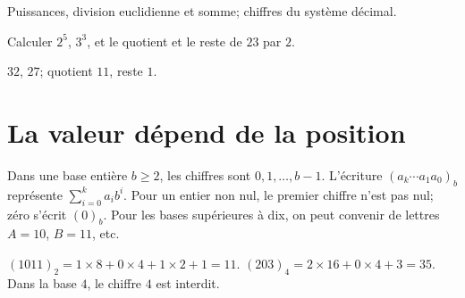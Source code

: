 \label{t11s-c11}
\begin{revision}Puissances, division euclidienne et somme; chiffres du système décimal.\end{revision}
\begin{automatismes}\exo\label{t11s-c11-auto}Calculer $2^5$, $3^3$, et le quotient et le reste de $23$ par $2$.\end{automatismes}
\begin{corrige}\label{sol-t11s-c11-auto}$32$, $27$; quotient $11$, reste $1$.\end{corrige}

\section{La valeur dépend de la position}
\begin{definition}Dans une base entière $b\ge2$, les chiffres sont $0,1,\ldots,b-1$. L’écriture $(a_k\cdots a_1a_0)_b$ représente $\sum_{i=0}^k a_i b^i$. Pour un entier non nul, le premier chiffre n’est pas nul; zéro s’écrit $(0)_b$. Pour les bases supérieures à dix, on peut convenir de lettres $A=10$, $B=11$, etc.\end{definition}
\begin{exemple}$(1011)_2=1\times8+0\times4+1\times2+1=11$. $(203)_4=2\times16+0\times4+3=35$. Dans la base $4$, le chiffre $4$ est interdit.\end{exemple}
